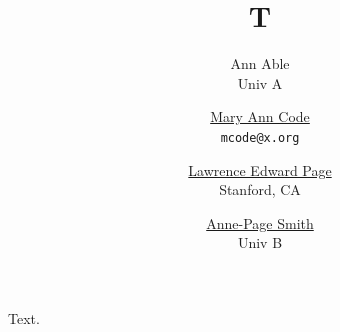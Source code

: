 \documentclass{article}
\title{T}
\author{Ann Able \\ Univ A \and \href{https://x.org/mc}{Mary Ann Code} \\ \texttt{mcode@x.org} \and \href{https://x.org/lp}{Lawrence Edward Page} \\ Stanford, CA \and \href{https://x.org/as}{Anne-Page Smith} \\ Univ B}
\begin{document}
\maketitle
Text.
\end{document}
